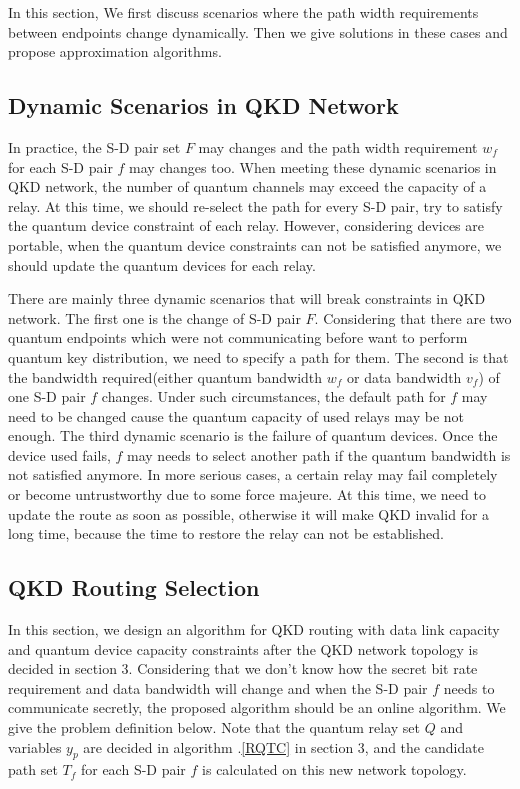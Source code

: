 In this section, We first discuss scenarios where the path width requirements between endpoints change dynamically. Then we give solutions in these cases and propose approximation algorithms.
\subsection{Dynamic Scenarios in QKD Network}
In practice, the S-D pair set $F$ may changes and the path width requirement $w_f$ for each S-D pair $f$ may changes too. When meeting these dynamic scenarios in QKD network, the number of quantum channels may exceed the capacity of a relay. At this time, we should re-select the path for every S-D pair, try to satisfy the quantum device constraint of each relay. However, considering devices are portable, when the quantum device constraints can not be satisfied anymore, we should update the quantum devices for each relay.


There are mainly three dynamic scenarios that will break constraints in QKD network. The first one is the change of S-D pair $F$. Considering that there are two quantum endpoints which were not communicating before want to perform quantum key distribution, we need to specify a path for them. The second is that the bandwidth required(either quantum bandwidth $w_f$ or data bandwidth $v_f$) of one S-D pair $f$ changes. Under such circumstances, the default path for $f$ may need to be changed cause the quantum capacity of used relays may be not enough. The third dynamic scenario is the failure of quantum devices. Once the device used fails, $f$ may needs to select another path if the quantum bandwidth is not satisfied anymore. In more serious cases, a certain relay may fail completely or become untrustworthy due to some force majeure. At this time, we need to update the route as soon as possible, otherwise it will make QKD invalid for a long time, because the time to restore the relay can not be established.



\subsection{QKD Routing Selection}
In this section, we design an algorithm for QKD routing with data link capacity and quantum device capacity constraints after the QKD network topology is decided in section 3. Considering that we don't know how the secret bit rate requirement and data bandwidth will change and when the S-D pair $f$ needs to communicate secretly, the proposed algorithm should be an online algorithm.
We give the problem definition below. Note that the quantum relay set $Q$ and variables $y_p$ are decided in algorithm .\ref{RQTC} in section 3, and the candidate path set $T_f$ for each S-D pair $f$ is calculated on this new network topology.


